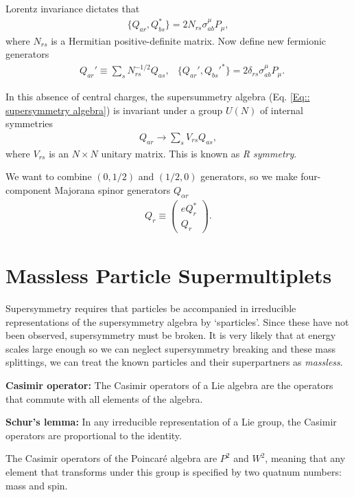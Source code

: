 \documentclass[twoside,english]{uiofysmaster}
\begin{document}
Lorentz invariance dictates that
\begin{align}
\{ Q_{ar}, Q_{bs}^* \} = 2 N_{rs} \sigma_{ab}^{\mu} P_{\mu},
\end{align} 
where $N_{rs}$ is a Hermitian positive-definite matrix. Now define new fermionic generators
\begin{align}
&Q_{ar}' \equiv \sum_s N_{rs}^{-1/2} Q_{as}, &\{ Q_{ar}', Q_{bs}'^* \} = 2 \delta_{rs} \sigma_{ab}^{\mu} P_{\mu}.
\end{align}

In this absence of central charges, the supersummetry algebra (Eq. \ref{Eq:: supersymmetry algebra}) is invariant under a group $U(N)$ of internal symmetries 
\begin{align}
Q_{ar} \rightarrow \sum_s V_{rs} Q_{as},
\end{align}
where $V_{rs}$ is an $N \times N$ unitary matrix. This is known as \textit{R symmetry}.

We want to combine $(0, 1/2)$ and $(1/2, 0)$ generators, so we make four-component Majorana spinor generators $Q_{\alpha r}$
\begin{align}
Q_r \equiv \begin{pmatrix}
e Q_r^*\\
Q_r
\end{pmatrix}.
\end{align}

\section{Massless Particle Supermultiplets}

Supersymmetry requires that particles be accompanied in irreducible representations of the supersymmetry algebra by `sparticles'. Since these have not been observed, supersymmetry must be broken. It is very likely that at energy scales large enough so we can neglect supersymmetry breaking and these mass splittings, we can treat the known particles and their superpartners as \textit{massless}.

\textbf{Casimir operator: } The Casimir operators of a Lie algebra are the operators that commute with all elements of the algebra.

\textbf{Schur's lemma:} In any irreducible representation of a Lie group, the Casimir operators are proportional to the identity.

The Casimir operators of the Poincar\'{e} algebra are $P^2$ and $W^2$, meaning that any element that transforms under this group is specified by two quatnum numbers: mass and spin.
\end{document}
